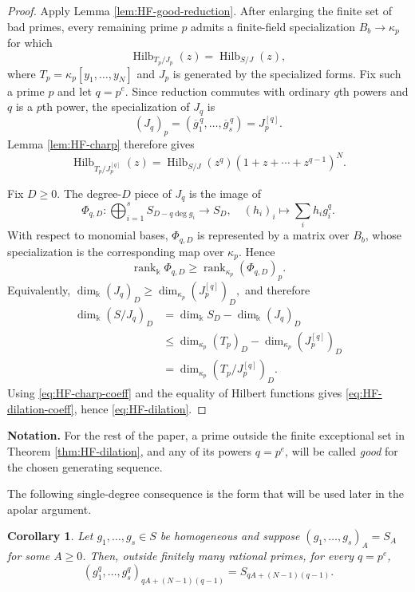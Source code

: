 \documentclass[11pt]{amsart}
\newtheorem{corollary}[theorem]{Corollary}
\theoremstyle{remark}
\newcommand{\kk}{\Bbbk}
\newcommand{\Hilb}{\operatorname{Hilb}}
\begin{document}
\begin{proof}
Apply Lemma \ref{lem:HF-good-reduction}. After enlarging the finite set of bad primes, every remaining prime $p$ admits a finite-field specialization $B_b\to\kappa_p$ for which
$$
\Hilb_{T_p/J_p}(z)=\Hilb_{S/J}(z),
$$
where $T_p=\kappa_p[y_1,\ldots,y_N]$ and $J_p$ is generated by the specialized forms. Fix such a prime $p$ and let $q=p^e$. Since reduction commutes with ordinary $q$th powers and $q$ is a $p$th power, the specialization of $J_q$ is
$$
(J_q)_p=(\overline g_1^{\,q},\ldots,\overline g_s^{\,q})=J_p^{[q]}.
$$
Lemma \ref{lem:HF-charp} therefore gives
$$
\Hilb_{T_p/J_p^{[q]}}(z)
=
\Hilb_{S/J}(z^q)(1+z+\cdots+z^{q-1})^N.
$$

Fix $D\ge0$. The degree-$D$ piece of $J_q$ is the image of
$$
\Phi_{q,D}:\bigoplus_{i=1}^sS_{D-q\deg g_i}\longrightarrow S_D,
\quad
(h_i)_i\longmapsto\sum_i h_i g_i^q.
$$
With respect to monomial bases, $\Phi_{q,D}$ is represented by a matrix over $B_b$, whose specialization is the corresponding map over $\kappa_p$. Hence
$$
\operatorname{rank}_{\kk}\Phi_{q,D}
\ge
\operatorname{rank}_{\kappa_p}(\Phi_{q,D})_p.
$$
Equivalently,
$
\dim_{\kk}(J_q)_D
\ge
\dim_{\kappa_p}(J_p^{[q]})_D,
$
and therefore
$$
\begin{aligned}
\dim_{\kk}(S/J_q)_D
&=\dim_{\kk}S_D-\dim_{\kk}(J_q)_D\\
&\le \dim_{\kappa_p}(T_p)_D-\dim_{\kappa_p}(J_p^{[q]})_D\\
&=\dim_{\kappa_p}(T_p/J_p^{[q]})_D.
\end{aligned}
$$
Using \eqref{eq:HF-charp-coeff} and the equality of Hilbert functions gives \eqref{eq:HF-dilation-coeff}, hence \eqref{eq:HF-dilation}.
\end{proof}

\medskip

\noindent\textbf{Notation.} For the rest of the paper, a prime outside the finite exceptional set in Theorem \ref{thm:HF-dilation}, and any of its powers $q=p^e$, will be called \emph{good} for the chosen generating sequence.

\medskip

The following single-degree consequence is the form that will be used later in the apolar argument.

\begin{corollary}\label{thm:frob-amp}
Let $g_1,\ldots,g_s\in S$ be homogeneous and suppose $(g_1,\ldots,g_s)_A=S_A$ for some $A\ge0$. Then, outside finitely many rational primes, for every $q=p^e$,
$$
(g_1^q,\ldots,g_s^q)_{qA+(N-1)(q-1)}
=
S_{qA+(N-1)(q-1)}.
$$
\end{corollary}
\end{document}
